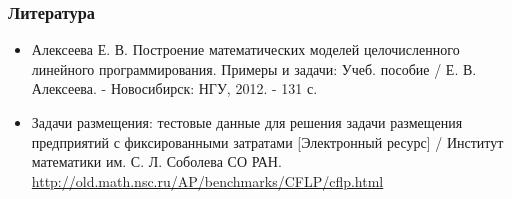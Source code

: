 \documentclass[12pt]{beamer}
\begin{document}
    \begin{frame}
        \frametitle{Литература}

        \vspace{-1cm}

        \begin{itemize}
            \item Алексеева Е. В. Построение математических моделей целочисленного линейного программирования. Примеры и задачи: Учеб. пособие / Е. В. Алексеева. - Новосибирск: НГУ, 2012. - 131 с.
            \item Задачи размещения: тестовые данные для решения задачи размещения предприятий с фиксированными затратами [Электронный ресурс] / Институт математики им. С. Л. Соболева СО РАН. \url{http://old.math.nsc.ru/AP/benchmarks/CFLP/cflp.html}
        \end{itemize}

    \end{frame}
	
\end{document}
